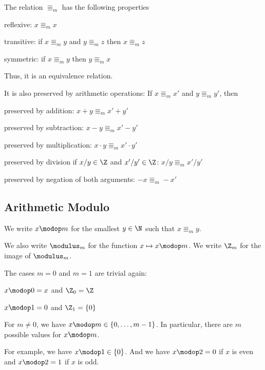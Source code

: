 \begin{theorem}[Modulo]\label{thm:modulo}
The relation $\Equiv_m$ has the following properties
\begin{compactitem}
\item reflexive: $x\Equiv_m x$
\item transitive: if $x\Equiv_m y$ and $y\Equiv_m z$ then $x\Equiv_m z$
\item symmetric: if $x\Equiv_m y$ then $y\Equiv_m x$
\end{compactitem}
Thus, it is an equivalence relation.
\medskip

It is also preserved by arithmetic operations: If $x\Equiv_m x'$ and $y\Equiv_m y'$, then
\begin{compactitem}
\item preserved by addition: $x+y\Equiv_m x'+y'$
\item preserved by subtraction: $x-y\Equiv_m x'-y'$
\item preserved by multiplication: $x\cdot y\Equiv_m x'\cdot y'$
\item preserved by division if $x/y\in \Z$ and $x'/y'\in \Z$: $x/y\Equiv_m x'/y'$
\item preserved by negation of both arguments: $-x\Equiv_m -x'$
\end{compactitem}
\end{theorem}

\subsection{Arithmetic Modulo}\label{sec:math:moduloarith}

\begin{definition}[Modulus]\label{def:math:modulofun}
 We write $x\modop m$ for the smallest $y\in\N$ such that $x\Equiv_m y$.
 
 We also write $\modulus_m$ for the function $x\mapsto x\modop m$.
 We write $\Z_m$ for the image of $\modulus_m$.
\end{definition}

\begin{remark}
The cases $m=0$ and $m=1$ are trivial again:
\begin{compactitem}
\item $x\modop 0=x$ and $\Z_0=\Z$
\item $x\modop 1=0$ and $\Z_1=\{0\}$
\end{compactitem}
\end{remark}

\begin{remark}
For $m\neq 0$, we have $x\modop m\in \{0,\ldots,m-1\}$.
In particular, there are $m$ possible values for $x\modop m$.

For example, we have $x\modop 1\in \{0\}$.
And we have $x\modop 2=0$ if $x$ is even and $x\modop 2=1$ if $x$ is odd.
\end{remark}

